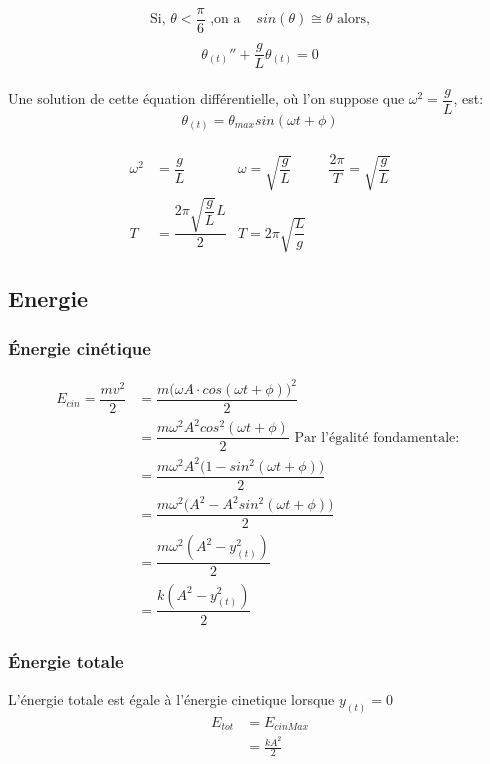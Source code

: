 \documentclass[11pt]{article}
\begin{document}
\newpage

\begin{equation}
\begin{split}
\text{Si, } \theta < \dfrac{\pi}{6} \text{ ,on a } & sin(\theta) \cong \theta \text{ alors,}\\
\end{split}
\end{equation}
$$\theta_{(t)}'' + \dfrac{g}{L} \theta_{(t)} = 0$$ \\
Une solution de cette équation différentielle, où l'on suppose que $\omega^2 = \dfrac{g}{L}$,  est: \\
$$\theta_{(t)} = \theta_{max} sin(\omega t + \phi)$$\\
\begin{align*}
    \omega^2 & = \dfrac{g}{L} 
    & \omega = \sqrt{\dfrac{g}{L}}&
    &\dfrac{2\pi}{T}  = \sqrt{\dfrac{g}{L}}\\
    T & = \dfrac{2\pi \sqrt{\dfrac{g}{L}}L}{2}
    & T = 2\pi \sqrt{\dfrac{L}{g}} &
\end{align*}

\subsection{Energie}
\subsubsection{Énergie cinétique}
\begin{equation}
\begin{split}
    E_{cin}  = \dfrac{mv^2}{2} & = \dfrac{m\Big(\omega A \cdot cos(\omega t+ \phi)\Big)^2}{2} \\
    & =\dfrac{ m\omega^2 A^2 cos^2(\omega t+ \phi)}{2} \text{ Par l'égalité fondamentale: } \\
    & = \dfrac{ m\omega^2 A^2 \Big(1-sin^2(\omega t+ \phi)\Big)}{2} \\
    & =\dfrac{m\omega^2\Big(A^2-A^2sin^2(\omega t+ \phi)\Big)}{2} \\
    & =\dfrac{m\omega^2(A^2-y_{(t)}^2)}{2} \\
    & = \dfrac{k(A^2-y_{(t)}^2)}{2}
\end{split}
\end{equation}
\subsubsection{Énergie totale}
 L'énergie totale est égale à l'énergie cinetique lorsque $y_{(t)}=0$ \\
 \begin{equation}
     \begin{split}
         E_{tot} & = E_{cinMax}\\
        & = \frac{kA^2}{2}
     \end{split}
 \end{equation}
\end{document}
